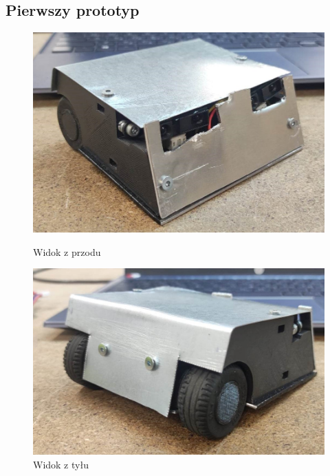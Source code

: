 \documentclass[polish,polish,a4paper]{article}
\begin{document}
    \subsection{Pierwszy prototyp}
        
            
    \begin{figure}[!htb]
       \begin{minipage}{0.3\textwidth}
         \centering
         \includegraphics[width=1.55\linewidth]{photo/Pierwszy_przod.jpg}
         \caption{Widok z przodu}\label{Fig:Data1}
       \end{minipage}\hspace{30mm}
       \begin{minipage}{0.3\textwidth}
         \centering
         \includegraphics[width=1.65\linewidth]{photo/Pierwszy_tyl.jpg}
         \caption{Widok z tyłu}\label{Fig:Data2}
       \end{minipage}
        \end{figure}
    
\end{document}

